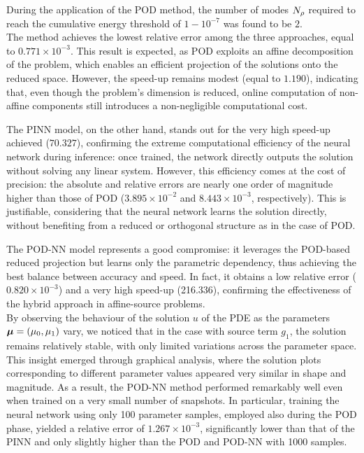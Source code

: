 \documentclass[
    conference,
    nofonttune,
    11pt
]{IEEEtran}
\begin{document}
                During the application of the POD method, the number of modes ${N_\rho}$ required to reach the cumulative energy threshold of $1 - 10^{-7}$ was found to be $2$.\\
                The method achieves the lowest relative error among the three approaches, equal to $0.771 \times 10^{-3}$. This result is expected, as POD exploits an affine decomposition of the problem, which enables an efficient projection of the solutions onto the reduced space. However, the speed-up remains modest (equal to $1.190$), indicating that, even though the problem's dimension is reduced, online computation of non-affine components still introduces a non-negligible computational cost.
                
                The PINN model, on the other hand, stands out for the very high speed-up achieved ($70.327$), confirming the extreme computational efficiency of the neural network during inference: once trained, the network directly outputs the solution without solving any linear system. However, this efficiency comes at the cost of precision: the absolute and relative errors are nearly one order of magnitude higher than those of POD ($3.895 \times 10^{-2}$ and $8.443 \times 10^{-3}$, respectively). This is justifiable, considering that the neural network learns the solution directly, without benefiting from a reduced or orthogonal structure as in the case of POD.
                
                The POD-NN model represents a good compromise: it leverages the POD-based reduced projection but learns only the parametric dependency, thus achieving the best balance between accuracy and speed. In fact, it obtains a low relative error ($0.820 \times 10^{-3}$) and a very high speed-up (216.336), confirming the effectiveness of the hybrid approach in affine-source problems.\\By observing the behaviour of the solution $u$ of the PDE as the parameters ${\boldsymbol\mu} = (\mu_0, \mu_1)$ vary, we noticed that in the case with source term $g_1$, the solution remains relatively stable, with only limited variations across the parameter space. This insight emerged through graphical analysis, where the solution plots corresponding to different parameter values appeared very similar in shape and magnitude. As a result, the POD-NN method performed remarkably well even when trained on a very small number of snapshots. In particular, training the neural network using only 100 parameter samples, employed also during the POD phase, yielded a relative error of $1.267 \times 10^{-3}$, significantly lower than that of the PINN and only slightly higher than the POD and POD-NN with 1000 samples.
                
\end{document}
